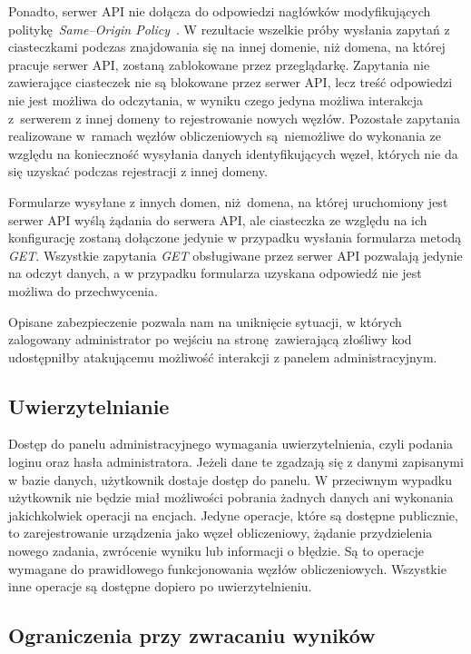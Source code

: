 \documentclass[a4paper,11pt,twoside]{report}
\theoremstyle{definition}
\begin{document}
Ponadto, serwer API nie dołącza do odpowiedzi nagłówków modyfikujących politykę \textit{Same--Origin Policy}~\cite{same-origin-policy}. W rezultacie wszelkie próby wysłania zapytań z ciasteczkami podczas znajdowania się na innej domenie, niż domena, na której pracuje serwer API, zostaną zablokowane przez przeglądarkę. 
Zapytania nie zawierające ciasteczek nie są blokowane przez serwer API, lecz treść odpowiedzi nie jest możliwa do odczytania, w wyniku czego jedyna możliwa interakcja z~serwerem z innej domeny to rejestrowanie nowych węzłów.
Pozostałe zapytania realizowane w~ramach węzłów obliczeniowych są niemożliwe do wykonania ze względu na konieczność wysyłania danych identyfikujących węzeł, których nie da się uzyskać podczas rejestracji z innej domeny.


Formularze wysyłane z innych domen, niż domena, na której uruchomiony jest serwer API wyślą żądania do serwera API, ale ciasteczka ze względu na ich konfigurację zostaną dołączone jedynie w przypadku wysłania formularza metodą \textit{GET}.
Wszystkie zapytania \textit{GET} obsługiwane przez serwer API pozwalają jedynie na odczyt danych, a w przypadku formularza uzyskana odpowiedź nie jest możliwa do przechwycenia.

Opisane zabezpieczenie pozwala nam na uniknięcie sytuacji, w których zalogowany administrator po wejściu na stronę zawierającą złośliwy kod udostępniłby atakującemu możliwość interakcji z panelem administracyjnym.

\subsection{Uwierzytelnianie} 

Dostęp do panelu administracyjnego wymagania uwierzytelnienia, czyli podania loginu oraz hasła administratora.
Jeżeli dane te zgadzają się z danymi zapisanymi w bazie danych, użytkownik dostaje dostęp do panelu.
W przeciwnym wypadku użytkownik nie będzie miał możliwości pobrania żadnych danych ani wykonania jakichkolwiek operacji na encjach.
Jedyne operacje, które są dostępne publicznie, to zarejestrowanie urządzenia jako węzeł obliczeniowy, żądanie przydzielenia nowego zadania, zwrócenie wyniku lub informacji o błędzie.
Są to operacje wymagane do prawidłowego funkcjonowania węzłów obliczeniowych. Wszystkie inne operacje są dostępne dopiero po uwierzytelnieniu.

\subsection{Ograniczenia przy zwracaniu wyników}
\end{document}
